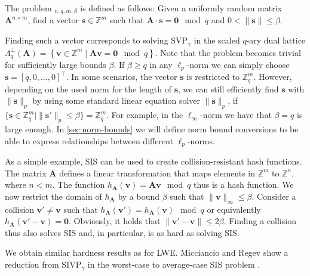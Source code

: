 \begin{definition}
    The problem $_{n, q, m, \beta}$ is defined as follows: Given a uniformly random matrix $\mathbf{A}^{n\times m}$, find a vector $\mathbf{s} \in \mathbb{Z}^m$ such that $\mathbf{A} \cdot \mathbf{s} = \mathbf{0} \mod q$ and $0 < \| \mathbf{s}\| \leq \beta$.
\end{definition}

Finding such a vector corresponds to solving SVP$_\gamma$ in the scaled $q$-ary dual lattice $\Lambda_q^\perp(\mathbf{A}) = \left\{ \mathbf{v} \in \mathbb{Z}^m \mid  \mathbf{A}\mathbf{v} = \mathbf{0} \mod q \right\}$. Note that the problem becomes trivial for sufficiently large bounds $\beta$. If $\beta\geq q$ in any $\ell_p$-norm we can simply choose $\mathbf{s} = [q, 0, \dots, 0]^\intercal$. In some scenarios, the vector $\mathbf{s}$ is restricted to $\mathbb{Z}_q^m$. However, depending on the used norm for the length of $\mathbf{s}$, we can still efficiently find $\mathbf{s}$ with $\|\mathbf{s}\|_p$ by using some standard linear equation solver $\|\mathbf{s}\|_p$, if $\{\mathbf{s}\in \mathbb{Z}_q^m \mid \|\mathbf{s}'\|_p \leq \beta\} = \mathbb{Z}_q^m$. For example, in the $\ell_\infty$-norm we have that $\beta=q$ is large enough. In \cref{sec:norm-bounds} we will define norm bound conversions to be able to express relationships between different  $\ell_p$-norms.

As a simple example, SIS can be used to create collision-resistant hash functions. The matrix $\mathbf{A}$ defines a linear transformation that maps elements in  $\mathbb{Z}^m$ to  $\mathbb{Z}^n$, where $n < m$. The function $h_\mathbf{A}(\mathbf{v}) = \mathbf{A} \mathbf{v} \mod q$ thus is a hash function. We now restrict the domain of $h_\mathbf{A}$ by a bound $\beta$ such that $\|\mathbf{v}\|_\infty \leq \beta$. Consider a collision $\mathbf{v}' \neq \mathbf{v}$ such that $h_\mathbf{A}(\mathbf{v}') = h_\mathbf{A}(\mathbf{v}) \mod q$ or equivalently $h_\mathbf{A}(\mathbf{v}' - \mathbf{v}) = \mathbf{0}$. Obviously, it holds that $\|\mathbf{v}' - \mathbf{v}\| \leq 2\beta$. Finding a collision thus also solves SIS and, in particular, is as hard as solving SIS.

We obtain similar hardness results as for LWE. Micciancio and Regev show a reduction from SIVP$_\gamma$ in the worst-case to average-case SIS problem \cite{MR04}.

